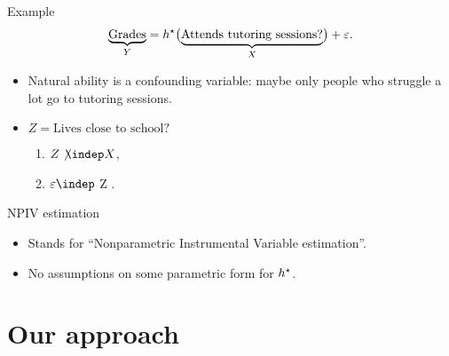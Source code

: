 \documentclass[aspectratio=169]{beamer}
\begin{document}
    \begin{frame}{Example}
        \begin{equation*}
            \underbrace{\text{Grades}}_{Y} = h^{ \star } \bigl( \underbrace{ \text{Attends tutoring sessions?} }_{X} \bigr) + \varepsilon
        .\end{equation*}
        \begin{itemize}
            \item<2-> Natural ability is a confounding variable: maybe only people who struggle a lot go to tutoring sessions.
            \item<3-> $ Z = \text{Lives close to school?} $
                \begin{enumerate}
                    \item<4-> $ Z \not\kern-1pt\indep X $,
                    \item<4-> $ \varepsilon \indep $ Z $ $.
                \end{enumerate}
        \end{itemize}
    \end{frame}

    \begin{frame}{NPIV estimation}
        \begin{itemize}
            \item<1-> Stands for ``Nonparametric Instrumental Variable estimation''.
            \item<2-> No assumptions on some parametric form for $ h^{ \star } $.
        \end{itemize}
    \end{frame}

    \section{Our approach}

\end{document}
